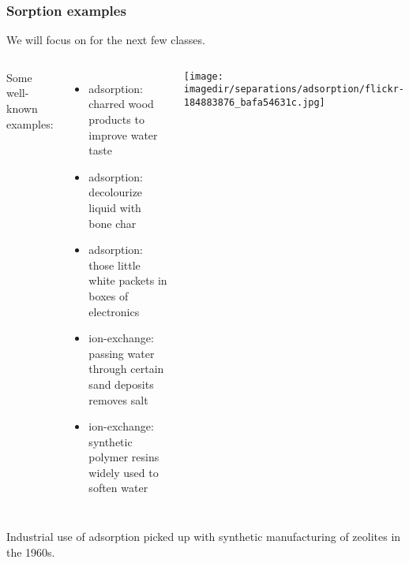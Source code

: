 \begin{frame}\frametitle{Sorption examples}
	\begin{exampleblock}{}
		We will focus on {\color{myGreen}{(ad)sorption}} for the next few classes.
	\end{exampleblock}

	\begin{columns}[t]
			Some well-known examples:
			\begin{itemize}
				\item	adsorption: charred wood products to improve water taste
				\item	adsorption: decolourize liquid with bone char
				\item	adsorption: those little white packets in boxes of electronics
				\item	ion-exchange: passing water through certain sand deposits removes salt
				\item	ion-exchange: synthetic polymer resins widely used to soften water
			\end{itemize}
			
			\begin{center}
				\texttt{[image: \\imagedir/separations/adsorption/flickr-184883876\_bafa54631c.jpg]}
			\end{center}
	\end{columns}
	
	\vspace{12pt}
	Industrial use of adsorption picked up with synthetic manufacturing of zeolites in the 1960s.
\end{frame}

